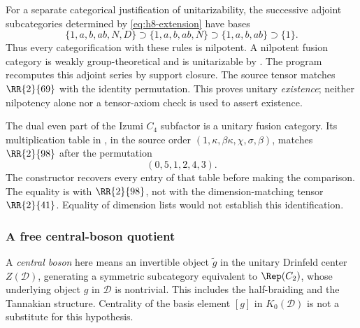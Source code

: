 For a separate categorical justification of unitarizability, the
successive adjoint subcategories determined by
\eqref{eq:h8-extension} have bases
\[
 \{1,a,b,ab,N,D\}\supset\{1,a,b,ab,N\}
 \supset\{1,a,b,ab\}\supset\{1\}.
\]
Thus every categorification with these rules is nilpotent. A nilpotent
fusion category is weakly group-theoretical and is unitarizable by
\cite[Theorem~5.20]{GHR}. The program recomputes this adjoint series by
support closure. The source tensor matches $\RR{2}{69}$ with the identity
permutation. This proves unitary \emph{existence}; neither nilpotency
alone nor a tensor-axiom check is used to assert existence.

The dual even part of the Izumi $C_4$ subfactor is a unitary fusion
category. Its multiplication table in \cite[p.~27]{IMP}, in the source
order $(1,\kappa,\beta\kappa,\chi,\sigma,\beta)$, matches
$\RR{2}{98}$ after the permutation
\[
 (0,5,1,2,4,3).
\]
The constructor recovers every entry of that table before making the
comparison. The equality is with $\RR{2}{98}$, not with the
dimension-matching tensor $\RR{2}{41}$. Equality of dimension lists
would not establish this identification.

\subsubsection{A free central-boson quotient}
A \emph{central boson} here means an invertible object $\widetilde g$ in
the unitary Drinfeld center $Z(\mathcal D)$, generating a symmetric
subcategory equivalent to $\Rep(C_2)$, whose underlying object $g$ in
$\mathcal D$ is nontrivial. This includes the half-braiding and the
Tannakian structure. Centrality of the basis element $[g]$ in
$K_0(\mathcal D)$ is not a substitute for this hypothesis.

